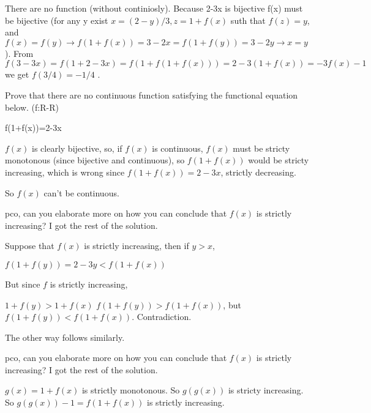 \begin{mysolution}
	There are no function (without continiosly).
Because 2-3x is bijective f(x) must be bijective (for any y exist $ x = (2-y)/3, z = 1+f(x)$ suth that $ f(z) = y$, and $ f(x) = f(y)\to f(1+f(x)) = 3-2x = f(1+f(y)) = 3-2y\to x = y$).
From $ f(3-3x) = f(1+2-3x) = f(1+f(1+f(x))) = 2-3(1+f(x)) =-3f(x)-1$ we get $ f(3/4) =-1/4$ .
\end{mysolution}



\begin{mysolution}
	\begin{tcolorbox}Prove that there are no continuous function satisfying the functional equation below. (f:R-R)

f(1+f(x))=2-3x\end{tcolorbox}

$ f(x)$ is clearly bijective, so, if $ f(x)$ is continuous, $ f(x)$ must be stricty monotonous (since bijective and continuous), so $ f(1+f(x))$ would be stricty increasing, which is wrong since $ f(1+f(x))=2-3x$, strictly decreasing.

So $ f(x)$ can't be continuous.
\end{mysolution}



\begin{mysolution}
	pco, can you elaborate more on how you can conclude that $ f(x)$ is strictly increasing? I got the rest of the solution.
\end{mysolution}



\begin{mysolution}
	Suppose that $ f(x)$ is strictly increasing, then if $ y>x$,

$ f(1+f(y)) = 2-3y < f(1+f(x))$

But since $ f$ is strictly increasing,

$ 1+f(y) > 1+f(x)$
$ f(1+f(y)) > f(1+f(x))$, but $ f(1+f(y))<f(1+f(x))$. Contradiction.

The other way follows similarly.
\end{mysolution}



\begin{mysolution}
	\begin{tcolorbox}pco, can you elaborate more on how you can conclude that $ f(x)$ is strictly increasing? I got the rest of the solution.\end{tcolorbox}

$ g(x)=1+f(x)$ is strictly monotonous. So $ g(g(x))$ is stricty increasing. So $ g(g(x))-1=f(1+f(x))$ is strictly increasing.
\end{mysolution}



